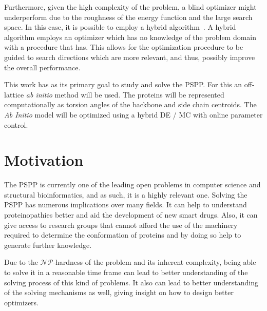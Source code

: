 Furthermore, given the high complexity of the problem, a blind optimizer might
underperform due to the roughness of the energy function and the large
search space. In this case, it is possible to employ a hybrid
algorithm~\cite{blum2011hybrid}. A hybrid algorithm employs an optimizer which has no
knowledge of the problem domain with a procedure that has. This allows for the
optimization procedure to be guided to search directions which are more
relevant, and thus, possibly improve the overall performance. 

This work has as its primary goal to study and solve the \ac{PSPP}. For this an
off-lattice \textit{ab initio} method will be used. The proteins will be
represented computationally as torsion angles of the backbone and side chain
centroids. The \textit{Ab Initio} model will be optimized
using a hybrid \ac{DE} / \ac{MC} with online parameter control. 


\section{Motivation}\label{sec:chap1_motivation}

The \ac{PSPP} is currently one of the leading open problems in computer science and
structural bioinformatics, and as such, it is a highly relevant one. Solving
the \ac{PSPP} has numerous implications over many fields. It can help to understand
proteinopathies better and aid the development of new smart drugs.
Also, it can give access to research groups that cannot afford the use of the
machinery required to determine the conformation of proteins and by doing so
help to generate further knowledge.

Due to the $\mathcal{NP}$-hardness of the problem and its inherent complexity,
being able to solve it in a reasonable time frame can lead to better
understanding of the solving process of this kind of problems. It also can lead
to better understanding of the solving mechanisms as well, giving insight on
how to design better optimizers.

